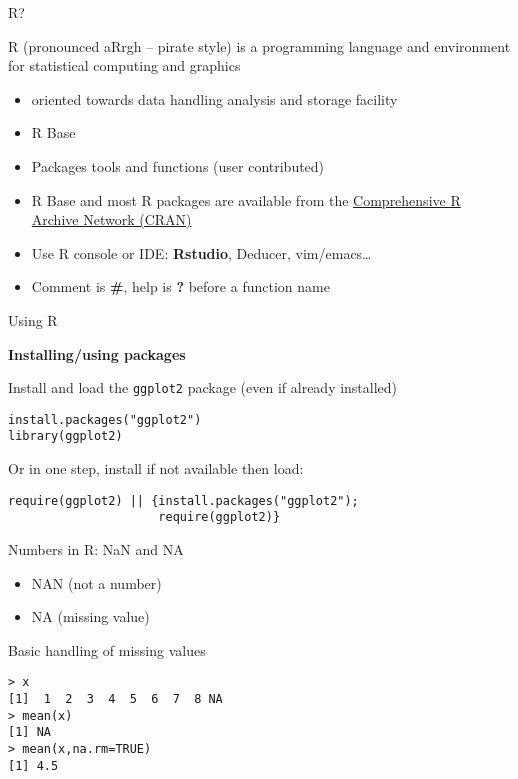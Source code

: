 \begin{frame}{R?}

R (pronounced aRrgh -- pirate style) is a programming language and
environment for statistical computing and graphics

\begin{itemize}
\item
  oriented towards data handling analysis and storage facility
\item
  R Base
\item
  Packages tools and functions (user contributed)
\item
  R Base and most R packages are available from the
  \href{cran.r-project.org}{Comprehensive R Archive Network (CRAN)}
\item
  Use R console or IDE: \textbf{Rstudio}, Deducer, vim/emacs\ldots{}
\item
  Comment is \textbf{\#}, help is \textbf{?} before a function name
\end{itemize}

\end{frame}

\begin{frame}[fragile]{Using R}

\begin{block}{\textbf{Installing/using packages}}

Install and load the \texttt{ggplot2} package (even if already
installed)

\begin{verbatim}
install.packages("ggplot2")
library(ggplot2)
\end{verbatim}

Or in one step, install if not available then load:

\begin{verbatim}
require(ggplot2) || {install.packages("ggplot2");
                     require(ggplot2)}
\end{verbatim}

\end{block}

\end{frame}

\begin{frame}[fragile]{Numbers in R: NaN and NA}

\begin{itemize}
\item
  NAN (not a number)
\item
  NA (missing value)
\end{itemize}

Basic handling of missing values

\begin{verbatim}
> x
[1]  1  2  3  4  5  6  7  8 NA
> mean(x)
[1] NA
> mean(x,na.rm=TRUE)
[1] 4.5 
\end{verbatim}

\end{frame}

